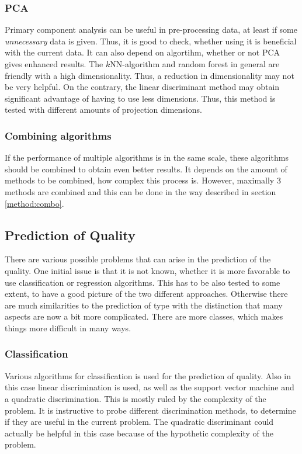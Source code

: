 \documentclass[twoside]{article}
\begin{document}
\begin{multicols}{2}
\subsubsection{PCA}

Primary component analysis can be useful in pre-processing data, at least if some \emph{unnecessary} data is given. Thus, it is good to check, whether
using it is beneficial with the current data. It can also depend on algortihm, whether or not PCA gives enhanced results. The $k$NN-algorithm and random
forest in general are friendly with a high dimensionality. Thus, a reduction in dimensionality may not be very helpful. On the contrary, the linear discriminant
method may obtain significant advantage of having to use less dimensions. Thus, this method is tested with different amounts of projection dimensions.

\subsubsection{Combining algorithms}

If the performance of multiple algorithms is in the same scale, these algorithms should be combined to obtain even better results. It depends on the amount
of methods to be combined, how complex this process is. However, maximally 3 methods are combined and this can be done in the way described in section \ref{method:combo}.

\subsection{Prediction of Quality}

There are various possible problems that can arise in the prediction of the quality. One initial issue is that it is
not known, whether it is more favorable to use classification or regression algorithms. This has to be also tested
to some extent, to have a good picture of the two different approaches. Otherwise there are much similarities to the 
prediction of type with the distinction that many aspects are now a bit more complicated. There are more classes, which
makes things more difficult in many ways.

\subsubsection{Classification}

Various algorithms for classification is used for the prediction of quality. Also in this case linear discrimination is used, as well 
as the support vector machine and a quadratic discrimination. This is mostly ruled by the complexity of the problem. It is instructive
to probe different discrimination methods, to determine if they are useful in the current problem. The quadratic discriminant could
actually be helpful in this case because of the hypothetic complexity of the problem.


\end{multicols}
\end{document}
